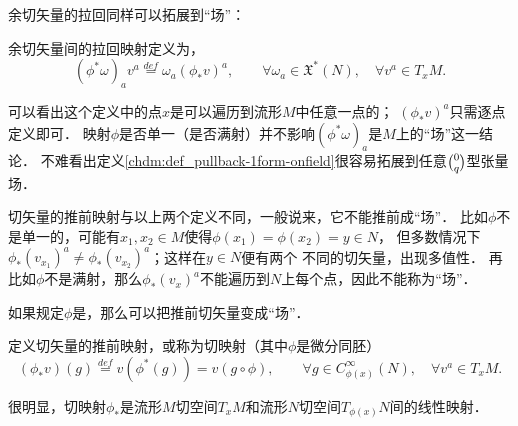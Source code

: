 余切矢量的拉回同样可以拓展到“场”：
\begin{definition}\label{chdm:def_pullback-1form-onfield}
    余切矢量间的{\heiti 拉回映射}定义为，
    \begin{equation}
        (\phi^{*}\omega)_a v^a \overset{def}{=} \omega_a (\phi_{*}v)^a ,
        \qquad \forall \omega_a \in \mathfrak{X}^{*}(N),\quad \forall v^a \in T_{x}M .
    \end{equation}
\end{definition}
可以看出这个定义中的点$x$是可以遍历到流形$M$中任意一点的；
$(\phi_{*}v)^a$只需逐点定义即可．
映射$\phi$是否单一（是否满射）并不影响$(\phi^{*}\omega)_a$是$M$上的“场”这一结论．
不难看出定义\ref{chdm:def_pullback-1form-onfield}很容易拓展到任意$\binom{0}{q}$型张量场．

切矢量的推前映射与以上两个定义不同，一般说来，它不能推前成“场”．
比如$\phi$不是单一的，可能有$x_1,x_2\in M$使得$\phi(x_1)=\phi(x_2)=y\in N$，
但多数情况下$\phi_*(v_{x_1})^a \neq \phi_*(v_{x_2})^a$；这样在$y\in N$便有两个
不同的切矢量，出现多值性．
再比如$\phi$不是满射，那么$\phi_*(v_{x})^a$不能遍历到$N$上每个点，因此不能称为“场”． 

如果规定$\phi$是，那么可以把推前切矢量变成“场”．
\begin{definition}\label{chdm:def_pushforward-vector-onfield}
    定义切矢量的{\heiti 推前映射}，或称为{\heiti 切映射}（其中$\phi$是微分同胚）
    \begin{equation}\label{chdm:eqn_pushforward-vector-onfield}
        (\phi_{*}v)(g) \overset{def}{=} v(\phi^{*}(g)) = v (g \circ \phi), 
        \qquad \forall g\in C^\infty_{\phi(x)}(N),\quad \forall v^a \in T_{x}M .
    \end{equation}
\end{definition}
很明显，切映射$\phi_{*}$是流形$M$切空间$T_xM$和流形$N$切空间$T_{\phi(x)}N$间的线性映射．

